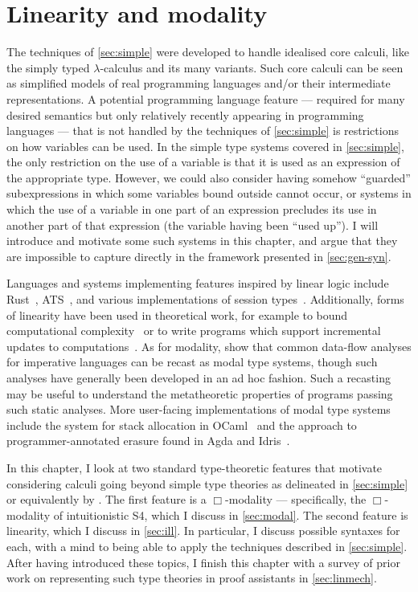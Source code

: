 \chapter{Linearity and modality}\label{sec:linearity}

The techniques of \cref{sec:simple} were developed to handle idealised core
calculi, like the simply typed $\lambda$-calculus and its many variants.
Such core calculi can be seen as simplified models of real programming languages
and/or their intermediate representations.
A potential programming language feature --- required for many desired semantics
but only relatively recently appearing in programming languages --- that is not
handled by the techniques of \cref{sec:simple} is restrictions on how variables
can be used.
In the simple type systems covered in \cref{sec:simple}, the only restriction on
the use of a variable is that it is used as an expression of the appropriate
type.
However, we could also consider having somehow ``guarded'' subexpressions in
which some variables bound outside cannot occur, or systems in which the use of
a variable in one part of an expression precludes its use in another part of
that expression (the variable having been ``used up'').
I will introduce and motivate some such systems in this chapter, and argue that
they are impossible to capture directly in the framework presented in
\cref{sec:gen-syn}.

Languages and systems implementing features inspired by linear logic include
Rust~\citep{MK14,Rust}, ATS~\citep{Xi04,ZX05}, and various implementations of
session types~\citep{HLVCCDMPRTVTZ16}.
Additionally, forms of linearity have been used in theoretical work, for example
to bound computational complexity~\citep{GSS92,Hofmann03} or to write programs
which support incremental updates to computations~\citep{ER03,Ehrhard18}.
As for modality, \citet{IMO20} show that common data-flow analyses for
imperative languages can be recast as modal type systems, though such analyses
have generally been developed in an ad hoc fashion.
Such a recasting may be useful to understand the metatheoretic properties of
programs passing such static analyses.
More user-facing implementations of modal type systems include the system for
stack allocation in OCaml~\citep{DW22} and the approach to programmer-annotated
erasure found in Agda and Idris~\citep{Atkey18}.

In this chapter, I look at two standard type-theoretic features that motivate
considering calculi going beyond simple type theories as delineated in
\cref{sec:simple} or equivalently by \citet{AACMM21}.
The first feature is a $\Box$-modality --- specifically, the $\Box$-modality of
intuitionistic S4, which I discuss in \cref{sec:modal}.
The second feature is linearity, which I discuss in \cref{sec:ill}.
In particular, I discuss possible syntaxes for each, with a mind to
being able to apply the techniques described in \cref{sec:simple}.
After having introduced these topics, I finish this chapter with a survey of
prior work on representing such type theories in proof assistants in
\cref{sec:linmech}.

